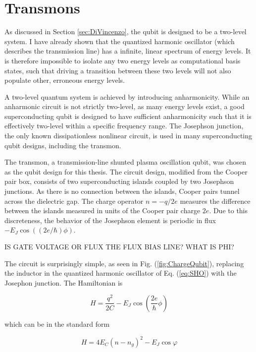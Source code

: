 \documentclass[12 pt]{book}
\begin{document}
\section{Transmons}
As discussed in Section \ref{sec:DiVincenzo}, the qubit is designed to be a two-level system. I have already shown that the quantized harmonic oscillator (which describes the transmission line) has a infinite, linear spectrum of energy levels. It is therefore impossible to isolate any two energy levels as computational basis states, such that driving a transition between these two levels will not also populate other, erroneous energy levels. 

A two-level quantum system is achieved by introducing anharmonicity. While an anharmonic circuit is not strictly two-level, as many energy levels exist, a good superconducting qubit is designed to have sufficient anharmonicity such that it is effectively two-level within a specific frequency range. The Josephson junction\cite{Devoret2004}, the only known dissipationless nonlinear circuit, is used in many superconducting qubit designs, including the transmon. 

The transmon, a transmission-line shunted plasma oscillation qubit\cite{Koch}, was chosen as the qubit design for this thesis. The circuit design, modified from the Cooper pair box\cite{Bouchiat, NakamuraCoherent}, consists of two superconducting islands coupled by two Josephson junctions. As there is no connection between the islands, Cooper pairs tunnel across the dielectric gap. The charge operator $n=-q/2e$ measures the difference between the islands measured in units of the Cooper pair charge $2e$. Due to this discreteness, the behavior of the Josephson element is periodic in flux $-E_J\cos((2e/\hbar)\phi)$. 

IS GATE VOLTAGE OR FLUX THE FLUX BIAS LINE? WHAT IS PHI?

The circuit is surprisingly simple, as seen in Fig. (\ref{fig:ChargeQubit}), replacing the inductor in the quantized harmonic oscillator of Eq. (\ref{eq:SHO}) with the Josephon junction. The Hamiltonian is

\begin{equation}
H=\frac{q^2}{2C}-E_J\cos\left(   \frac{2e}{\hbar}\phi     \right)
\end{equation}

which can be in the standard form

\begin{equation}
H=4E_C(n-n_g)^2-E_J\cos\varphi
\end{equation}
\end{document}
